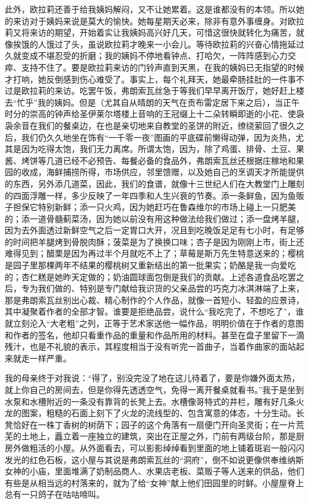 \par 此外，欧拉莉还善于给我姨妈解闷，又不让她累着。这是谁都没有的本领。所以她的来访对于姨妈来说是莫大的愉快。她每星期天必来，除非有意外事缠身。对欧拉莉又将来访的期望，开始着实让我姨妈高兴好几天，可惜这很快就转化为痛苦，就像挨饿的人饿过了头，虽说欧拉莉才晚来一小会儿。等待欧拉莉的兴奋心情拖延过久就变成不堪忍受的折磨；我的姨妈不停地看钟点、打哈欠，一阵阵感到心力交瘁、支持不住了。要是欧拉莉来访的门铃声直到天黑，在我的姨妈已无指望的时候才打响，她反倒感到伤心难受了。事实上，每个礼拜天，她最牵肠挂肚的一件事不过是欧拉莉的来访。吃罢午饭，弗朗索瓦丝急于等我们早早离开饭厅，她好赶上楼去“忙乎”我的姨妈。但是（尤其自从晴朗的天气在贡布雷定居下来之后），当正午时分的崇高的钟声给圣伊莱尔塔楼上音响的王冠缀上十二朵转瞬即逝的小花、使袅袅余音在我们的餐桌边，在也是亲切地来自教堂的圣饼的附近，缭绕萦回了很久之后，我们仍久久地坐在饰有“一千零一夜”图画的平底碟前懒得动弹，因为炎热，尤其是因为吃得太饱，我们无力离席。所谓太饱，因为，除了鸡蛋、排骨、土豆、果酱、烤饼等几道已经不必预告、每餐必备的食品外，弗朗索瓦丝还根据庄稼地和果园的收成，海鲜捕捞所得，市场供应，邻里馈赠，以及她自己的烹调天才所能提供的东西，另外添几道菜，因此，我们的食谱，就像十三世纪人们在大教堂门上雕刻的四面浮雕一样，多少反映了一年四季和人生兴衰的节奏。添一条鲜鱼，因为鱼贩子担保它特别新鲜；添一只火鸡，因为她赶巧在鲁森维尔的市场上碰上一只肥美的；添一道骨髓蓟菜汤，因为她以前没有用这种做法给我们做过；添一盘烤羊腿，因为去外面透过新鲜空气之后一定胃口大开，况且到吃晚饭足足有七小时，有足够的时间把羊腿烤到骨脱肉酥；菠菜是为了换换口味；杏子是因为刚刚上市，街上还难得见到；醋栗是因为再过半个月就吃不上了；草莓是斯万先生特意送来的；樱桃是园子里那棵两年不结果的樱桃树又重新结出的第一批果实；奶酪是我一向爱吃的；杏仁糕是她昨天定做的；奶油圆球面包倒是我们的贡献。上述各道食品吃罢之后，专为我们做的、特别是专门献给我识货的父亲品尝的巧克力冰淇淋端了上来，那是弗朗索瓦丝别出心裁、精心制作的个人作品，就像一首短小、轻盈的应景诗，其中凝聚着作者的全部才智。谁要是拒绝品尝，说什么“我吃完了，不想吃了”，谁就立刻沦入“大老粗”之列，正等于艺术家送他一幅作品，明明价值在于作者的意图和作者的签名，他却只看重作品的重量和作品所用的材料。甚至在盘子里留下一滴残汁，也是不礼貌的表示，其程度相当于没有听完一首曲子，当着作曲家的面站起来就走一样严重。
\par 我的母亲终于对我说：“得了，别没完没了地在这儿待着了，要是你嫌外面太热，就上你自己的房间去，但是你得先透透空气，免得一离开餐桌就看书。”我于是坐到水泵和水槽附近的一条没有靠背的长凳上去。水槽像哥特式的井栏，雕有好几条火龙的图案，粗糙的石面上刻下了火龙的流线型的、包含寓意的体态，十分生动。长凳恰好在一株丁香树的树荫下；园子的这个角落有一扇便门开向圣灵街；在一片荒芜的土地上，矗立着一座独立的建筑，突出在正屋之外，门前有两级台阶，那是厨房外做粗活的小屋。从外面看去，可以影影绰绰看到里面的地上铺着斑岩一般闪闪发光的红色石板，这小屋与其说是弗朗索瓦丝的“洞府”，倒不如说更像供奉维纳斯女神的小庙，里面堆满了奶制品商人、水果店老板、菜贩子等人送来的供品，他们有些是从相当远的村落来的，就为了给“女神”献上他们田园里的时鲜。小屋屋脊上总有一只鸽子在咕咕啼叫。
